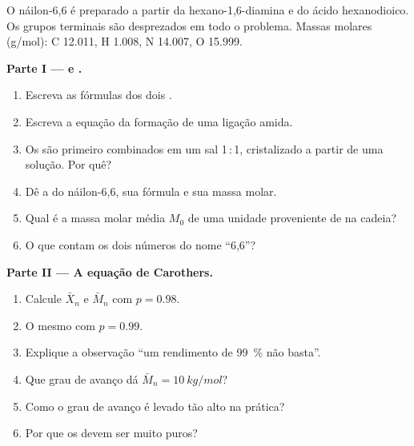 \begin{problem}
\label{pb:b2:polymer-synthesis:1}
O náilon-6,6 é preparado a partir da hexano-1,6-diamina e do ácido hexanodioico. Os grupos terminais
são desprezados em todo o problema. Massas molares (\unit{g/mol}): C 12.011, H 1.008, N 14.007, O 15.999.

\medskip
\noindent\textbf{Parte I ---  e .}
\begin{enumerate}
  \item Escreva as fórmulas dos dois .
  \item Escreva a equação da formação de uma ligação amida.
  \item Os  são primeiro combinados em um sal 1\,:\,1, cristalizado a partir de uma solução. Por quê?
  \item Dê a  do náilon-6,6, sua fórmula e sua massa molar.
  \item Qual é a massa molar média $M_0$ de uma unidade proveniente de  na cadeia?
  \item O que contam os dois números do nome ``6,6''?
\end{enumerate}

\medskip
\noindent\textbf{Parte II --- A equação de Carothers.}
\begin{enumerate}[resume]
  \item Calcule $\bar X_n$ e $\bar M_n$ com $p = 0.98$.
  \item O mesmo com $p = 0.99$.
  \item Explique a observação ``um rendimento de 99~\% não basta''.
  \item Que grau de avanço dá $\bar M_n = \qty{10}{kg/mol}$?
  \item Como o grau de avanço é levado tão alto na prática?
  \item Por que os  devem ser muito puros?
\end{enumerate}


\end{problem}

